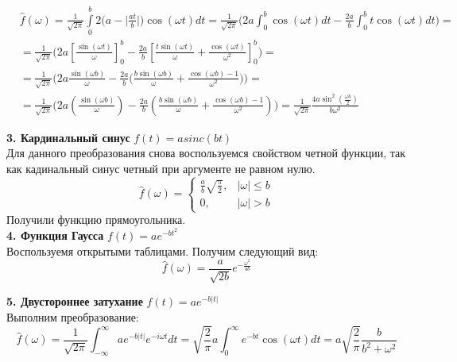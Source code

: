 \documentclass[a4paper,12pt]{article}
\begin{document}
\begin{equation*}
\begin{split}
    &\hat{f}(\omega) = \frac{1}{\sqrt{2\pi}}\int\limits_{0}^{b} 2\Big(a-\Big|\frac{at}{b}\Big|\Big) \cos{(\omega t)}dt = \frac{1}{\sqrt{2\pi}}\Big(2a \int_{0}^{b} \cos(\omega t) dt - \frac{2a}{b} \int_{0}^{b} t \cos(\omega t) dt\Big) =\\
    &= \frac{1}{\sqrt{2\pi}}\Big(2a\left[ \frac{\sin(\omega t)}{\omega} \right]_{0}^{b} - \frac{2a}{b}\left[ \frac{t \sin(\omega t)}{\omega} + \frac{\cos(\omega t)}{\omega^2} \right]_{0}^{b}\Big) =\\
    &= \frac{1}{\sqrt{2\pi}}\Big(2a\frac{\sin(\omega b)}{\omega}  - \frac{2a}{b}\Big(\frac{b \sin(\omega b)}{\omega} + \frac{\cos(\omega b) - 1}{\omega^2}\Big)\Big) =\\
    &=\frac{1}{\sqrt{2\pi}}\Big( 2a \left( \frac{\sin(\omega b)}{\omega} \right) - \frac{2a}{b} \left( \frac{b \sin(\omega b)}{\omega} + \frac{\cos(\omega b) - 1}{\omega^2} \right)\Big) = \frac{1}{\sqrt{2\pi}}\frac{4a \sin^2\left(\frac{\omega b}{2}\right)}{b\omega^2}
\end{split}
\end{equation*}
\newpage

\textbf{3. Кардинальный синус} $f(t) = a sinc(bt)$\\

Для данного преобразования снова воспользуемся свойством четной функции, так как кадинальный синус четный при аргументе не равном нулю. 
\begin{equation*}
    \hat{f}(\omega) = \begin{cases} 
\frac{a}{b}\sqrt{\frac{\pi}{2}}, & |\omega| \le b \\ 
0, & |\omega| > b 
\end{cases}
\end{equation*}
Получили функцию прямоугольника.\\

\textbf{4. Функция Гаусса} $f(t) = ae^{-bt^2}$\\

Воспользуемя открытыми таблицами. Получим следующий вид:
\begin{equation*}
    \hat{f}(\omega) = \frac{a}{\sqrt{2b}}e^{-\frac{\omega^2}{4b}}
\end{equation*}

\textbf{5. Двустороннее затухание} $f(t) = ae^{-b|t|}$\\

Выполним преобразование:
\begin{equation*}
    \hat{f}(\omega) = \frac{1}{\sqrt{2\pi}} \int_{-\infty}^{\infty} a e^{-b|t|} e^{-i\omega t} dt =\sqrt{\frac{2}{\pi}} a \int_{0}^{\infty} e^{-bt} \cos(\omega t) dt = a \sqrt{\frac{2}{\pi}} \frac{b}{b^2 + \omega^2}
\end{equation*}
\end{document}
